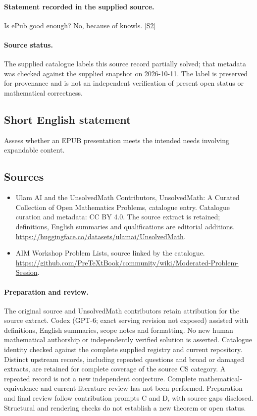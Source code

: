 \documentclass[11pt]{article}
\begin{document}
\paragraph{Statement recorded in the supplied source.}
Is ePub good enough? No, because of knowls. \href{https://github.com/PreTeXtBook/community/wiki/Moderated-Problem-Session}{[S2]}
\paragraph{Source status.}
The supplied catalogue labels this source record partially solved; that metadata was checked against the supplied snapshot on 2026-10-11. The label is preserved for provenance and is not an independent verification of present open status or mathematical correctness.
\subsection{Short English statement}
Assess whether an EPUB presentation meets the intended needs involving expandable content.
\subsection{Sources}
\begin{itemize}
\item[S1] Ulam AI and the UnsolvedMath Contributors, UnsolvedMath: A Curated Collection of Open Mathematics Problems, catalogue entry. Catalogue curation and metadata: CC BY 4.0. The source extract is retained; definitions, English summaries and qualifications are editorial additions.
\url{https://huggingface.co/datasets/ulamai/UnsolvedMath}.
\item[S2] AIM Workshop Problem Lists, source linked by the catalogue.
\url{https://github.com/PreTeXtBook/community/wiki/Moderated-Problem-Session}.
\end{itemize}
\paragraph{Preparation and review.}
The original source and UnsolvedMath contributors retain attribution for the source extract. Codex (GPT-6; exact serving revision not exposed) assisted with definitions, English summaries, scope notes and formatting. No new human mathematical authorship or independently verified solution is asserted. Catalogue identity checked against the complete supplied registry and current repository. Distinct upstream records, including repeated questions and broad or damaged extracts, are retained for complete coverage of the source CS category. A repeated record is not a new independent conjecture. Complete mathematical-equivalence and current-literature review has not been performed. Preparation and final review follow contribution prompts C and D, with source gaps disclosed. Structural and rendering checks do not establish a new theorem or open status.
\label{end:statement}
\end{document}
